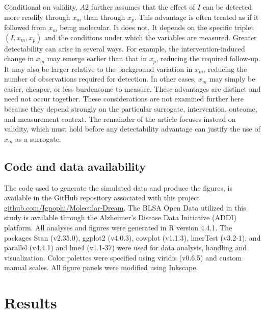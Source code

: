 \documentclass[twocolumn]{article} %
\begin{document}
Conditional on validity, $A2$ further assumes that the effect of $I$ can be detected more readily through $x_m$ than through $x_p$. This advantage is often treated as if it followed from $x_m$ being molecular. It does not. It depends on the specific triplet $(I, x_m, x_p)$ and the conditions under which the variables are measured. Greater detectability can arise in several ways. For example, the intervention-induced change in $x_m$ may emerge earlier \citep[f]{waziry2023effect} than that in $x_p$, reducing the required follow-up. It may also be larger relative to the background variation in $x_m$, reducing the number of observations required for detection. In other cases, $x_m$ may simply be easier, cheaper, or less burdensome to measure. These advantages are distinct and need not occur together. These considerations are not examined further here because they depend strongly on the particular surrogate, intervention, outcome, and measurement context. The remainder of the article focuses instead on validity, which must hold before any detectability advantage can justify the use of $x_m$ as a surrogate.

\subsection{Code and data availability}
The code used to generate the simulated data and produce the figures, is available in the GitHub repository associated with this project \href{https://github.com/Ignophi/Molecular-Dream}{github.com/Ignophi/Molecular-Dream}. The BLSA Open Data utilized in this study is available through the Alzheimer’s Disease Data Initiative (ADDI) platform. All analyses and figures were generated in R version 4.4.1. The packages Stan (v2.35.0), ggplot2 (v4.0.3), cowplot (v1.1.3), lmerTest (v3.2-1), and parallel (v4.4.1) and lme4 (v1.1-37) were used for data analysis, handling and visualization. Color palettes were specified using viridis (v0.6.5) and custom manual scales. All figure panels were modified using Inkscape.


\section{Results}
\end{document}
